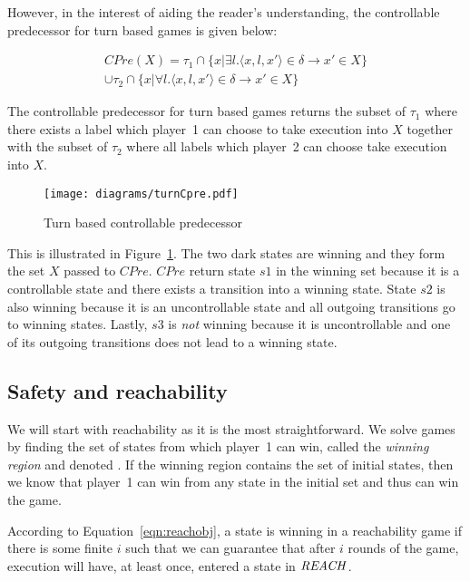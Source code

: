 However, in the interest of aiding the reader's understanding, the controllable predecessor for turn based games is given below:

\begin{multline}
CPre(X) = \tau_1 \cap \{x | \exists l. \langle x, l, x' \rangle \in \delta \rightarrow x' \in X\} \\ \cup \tau_2 \cap \{x | \forall l. \langle x, l, x' \rangle \in \delta \rightarrow x' \in X \}
\label{eqn:turn_cpre}
\end{multline}

The controllable predecessor for turn based games returns the subset of $\tau_1$ where there exists a label which player~1 can choose to take execution into $X$ together with the subset of $\tau_2$ where all labels which player~2 can choose take execution into $X$. 

\begin{figure}[t]
\centering
\texttt{[image: diagrams/turnCpre.pdf]}
\caption{Turn based controllable predecessor}
\label{fig:turn_cpre}
\end{figure}

This is illustrated in Figure~\ref{fig:turn_cpre}. The two dark states are winning and they form the set $X$ passed to $CPre$. $CPre$ return state $s1$ in the winning set because it is a controllable state and there exists a transition into a winning state. State $s2$ is also winning because it is an uncontrollable state and all outgoing transitions go to winning states. Lastly, $s3$ is \emph{not} winning because it is uncontrollable and one of its outgoing transitions does not lead to a winning state.

\subsection{Safety and reachability}

We will start with reachability as it is the most straightforward. We solve games by finding the set of states from which player~1 can win, called the \emph{winning region} and denoted \win. If the winning region contains the set of initial states, then we know that player~1 can win from any state in the initial set and thus can win the game.

According to Equation~\ref{eqn:reachobj}, a state is winning in a reachability game if there is some finite $i$ such that we can guarantee that after $i$ rounds of the game, execution will have, at least once, entered a state in $\mathit{REACH}$. 

